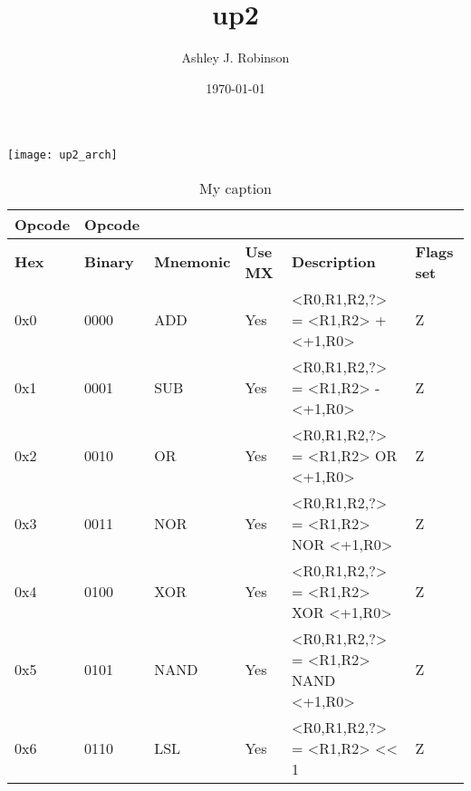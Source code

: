 \documentclass[a4paper]{article}
\title{up2}
\author{Ashley J. Robinson}
\date{\today}
\begin{document}
\maketitle

\section{}

\texttt{[image: up2\_arch]}

\begin{table}[]
    \centering
    \caption{My caption}
    \label{my-label}
    \begin{tabular}{|l|l|l|l|l|l|}
        \hline
        \textbf{Opcode}     &   \textbf{Opcode} &                       &                       &                                           &                           \\ \hline  
        \textbf{Hex}        &   \textbf{Binary} &   \textbf{Mnemonic}   &   \textbf{Use MX}     &   \textbf{Description}                    &   \textbf{Flags set}      \\ \hline  
        0x0                 &   0000            &   ADD                 &   Yes                 &   <R0,R1,R2,?> = <R1,R2> + <+1,R0>        &   Z                       \\ \hline  
        0x1                 &   0001            &   SUB                 &   Yes                 &   <R0,R1,R2,?> = <R1,R2> - <+1,R0>        &   Z                       \\ \hline  
        0x2                 &   0010            &   OR                  &   Yes                 &   <R0,R1,R2,?> = <R1,R2> OR <+1,R0>       &   Z                       \\ \hline  
        0x3                 &   0011            &   NOR                 &   Yes                 &   <R0,R1,R2,?> = <R1,R2> NOR <+1,R0>      &   Z                       \\ \hline  
        0x4                 &   0100            &   XOR                 &   Yes                 &   <R0,R1,R2,?> = <R1,R2> XOR <+1,R0>      &   Z                       \\ \hline  
        0x5                 &   0101            &   NAND                &   Yes                 &   <R0,R1,R2,?> = <R1,R2> NAND <+1,R0>     &   Z                       \\ \hline 
        0x6                 &   0110            &   LSL                 &   Yes                 &   <R0,R1,R2,?> = <R1,R2> << 1             &   Z                       \\ \hline 

\end{tabular}
\end{table}
\end{document}
